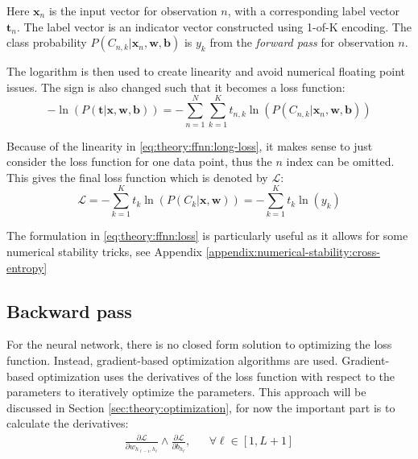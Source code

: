 Here $\mathbf{x}_{n}$ is the input vector for observation $n$, with a corresponding label vector $\mathbf{t}_n$. The label vector is an indicator vector constructed using 1-of-K encoding. The class probability $P(C_{n, k} | \mathbf{x}_n, \mathbf{w}, \mathbf{b})$ is $y_k$ from the \textit{forward pass} for observation $n$.

The logarithm is then used to create linearity and avoid numerical floating point issues. The sign is also changed such that it becomes a loss function:
\begin{equation}
- \ln\left(P(\mathbf{t} | \mathbf{x}, \mathbf{w}, \mathbf{b})\right) = - \sum_{n=1}^N \sum_{k=1}^K t_{n, k} \ln\left( P(C_{n, k} | \mathbf{x}_n, \mathbf{w}, \mathbf{b})\right)
\label{eq:theory:ffnn:long-loss}
\end{equation}

Because of the linearity in \eqref{eq:theory:ffnn:long-loss}, it makes sense to just consider the loss function for one data point, thus the $n$ index can be omitted. This gives the final loss function which is denoted by $\mathcal{L}$:
\begin{equation}
\mathcal{L} = - \sum_{k=1}^K t_{k} \ln\left( P(C_{k} | \mathbf{x}, \mathbf{w})\right) =  - \sum_{k=1}^K t_k \ln(y_k)
\label{eq:theory:ffnn:loss}
\end{equation}

The formulation in \eqref{eq:theory:ffnn:loss} is particularly useful as it allows for some numerical stability tricks, see Appendix \ref{appendix:numerical-stability:cross-entropy}

\subsection{Backward pass}

For the neural network, there is no closed form solution to optimizing the loss function. Instead, gradient-based optimization algorithms are used. Gradient-based optimization uses the derivatives of the loss function with respect to the parameters to iteratively optimize the parameters. This approach will be discussed in Section \ref{sec:theory:optimization}, for now the important part is to calculate the derivatives:
\begin{equation}
\begin{aligned}
\frac{\partial \mathcal{L}}{\partial w_{h_{\ell-1}, h_\ell}} \wedge \frac{\partial \mathcal{L}}{\partial b_{h_\ell}}, && \forall \ell \in [1, L + 1]
\end{aligned}
\label{eq:theory:ffnn:bprop-problem}
\end{equation}

